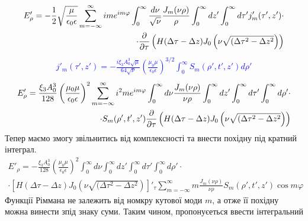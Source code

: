 %
\begin{equation*} \begin{aligned}
E'_\rho = - \frac{1}{2}  \sqrt{\frac{\mu}{\epsilon_0 \epsilon}}
\sum_{m=-\infty}^\infty i m e^{im\varphi} \int_0^\infty 
\frac{d \nu}{\sqrt{\nu}} \frac{J_m(\nu \rho)}{\rho} \int_0^\infty dz' 
\int_0^\infty d \tau' j'_m (\tau',z') \cdot \\
\cdot \frac{\partial }{\partial \tau} \left( H(\Delta \tau - \Delta z) 
J_0 \left( \nu \sqrt{(\Delta \tau^2 - \Delta z^2} \right) \right)
\end{aligned} \end{equation*}
%
\textcolor{blue} {  \begin{equation*} \begin{aligned} 
j'_m (\tau',z') = - \frac{i \xi_3 A_0^3 \sqrt{\mu}}{64 \sqrt{\nu}}
\left( \frac{\mu_0 \mu} {\epsilon_0 \epsilon} \right)^{3/2}
\int_0^\infty S_m (\rho',t',z') d \rho'
\end{aligned} \end{equation*} }
%
\textcolor{blue} {  \begin{equation*} \begin{aligned}
E'_\rho = \frac{\xi_3 A_0^3}{128} 
\left( \frac{\mu_0 \mu}{\epsilon_0 \epsilon} \right)^2
\sum_{m=-\infty}^\infty i^2 m e^{im\varphi} \int_0^\infty d \nu 
\frac{J_m(\nu \rho)}{\nu \rho} \int_0^\infty dz' 
\int_0^\infty d \tau' \int_0^\infty d \rho' \cdot \\
\cdot S_m (\rho',t',z') \frac{\partial }{\partial \tau} \left( H(\Delta \tau - \Delta z) 
J_0 \left( \nu \sqrt{(\Delta \tau^2 - \Delta z^2} \right) \right)
\end{aligned} \end{equation*} }
%
Тепер маємо змогу звільнитись від комплексності та внести похідну під 
кратний інтеграл.
%
\begin{equation*} \begin{aligned}
E'_\rho = - \frac{\xi_3 A_0^3}{128} 
\left( \frac{\mu_0 \mu}{\epsilon_0 \epsilon} \right)^2
\int_0^\infty d \nu \int_0^\infty dz' 
\int_0^\infty d \tau' \int_0^\infty d \rho' \cdot \\
\cdot \left[ H(\Delta \tau - \Delta z) 
J_0 \left( \nu \sqrt{(\Delta \tau^2 - \Delta z^2} \right) \right]'_\tau
 \sum_{m=-\infty}^\infty m \frac{J_m(\nu \rho)}{\nu \rho} 
S_m (\rho',t',z') \cos m \varphi
\end{aligned} \end{equation*}
%
Функції Ріммана не залежить від номкру кутової моди $ m $, а отже її похідну 
можна винести зпід знаку суми. Таким чином, пропонуєеться ввести інтегральний
